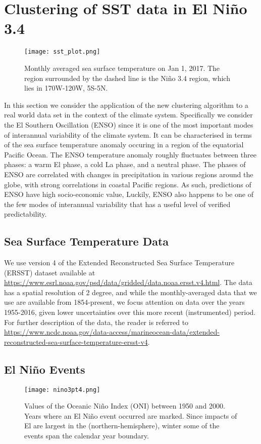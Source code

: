 \documentclass[10pt,journal,compsoc]{IEEEtran} %
\theoremstyle{definition}
\newcommand{\nino}{\text{Ni\~{n}o }}
\newcommand{\nina}{\text{Ni\~{n}a }}
\begin{document}
\section{Clustering of SST data in El Ni\~{n}o 3.4 }
\begin{figure*}[htp]
\texttt{[image: sst\_plot.png]}
\caption{Monthly averaged sea surface temperature on Jan 1, 2017.  The
region surrounded by the dashed line is the Ni\~{n}o 3.4 region, which
lies in 170W-120W, 5S-5N. }\label{sstplot}
\end{figure*}
In this section we consider the application of the new clustering
algorithm to a real world data set in the context of the climate
system.  Specifically we consider the El \nino Southern Oscillation
(ENSO) since it is one of the most important modes of interannual
variability of the climate system. It can be characterised in terms of
the sea surface temperature anomaly occuring in a region of the
equatorial Pacific Ocean.  The ENSO temperature anomaly roughly
fluctuates between three phases: a warm El \nino phase, a cold La
\nina phase, and a neutral phase.  The phases of ENSO are correlated
with changes in precipitation in various regions around the globe,
with strong correlations in coastal Pacific regions. As such,
predictions of ENSO have high socio-economic value, Luckily, ENSO also
happens to be one of the few modes of interannual variability that has
a useful level of verified predictability.

\subsection{Sea Surface Temperature Data}
We use version 4 of the Extended Reconstructed Sea Surface Temperature
(ERSST) dataset available at
\url{https://www.esrl.noaa.gov/psd/data/gridded/data.noaa.ersst.v4.html}.
The data has a spatial resolution of 2 degree, and while the
monthly-averaged data that we use are available from 1854-present, we
focus attention on data over the years 1955-2016, given lower
uncertainties over this more recent (instrumented) period. For further
description of the data, the reader is referred to
\url{https://www.ncdc.noaa.gov/data-access/marineocean-data/extended-reconstructed-sea-surface-temperature-ersst-v4}.

\subsection{El Ni\~{n}o Events}
\begin{figure*}[htp]
\texttt{[image: nino3pt4.png]}
\caption{Values of the Oceanic Ni\~{n}o Index (ONI) between 1950 and
2000.  Years where an El Ni\~{n}o event occurred are marked. Since
impacts of El \nino are largest in the (northern-hemisphere), winter
some of the events span the calendar year boundary.}
\label{nino3.4}
\end{figure*}
\end{document}
